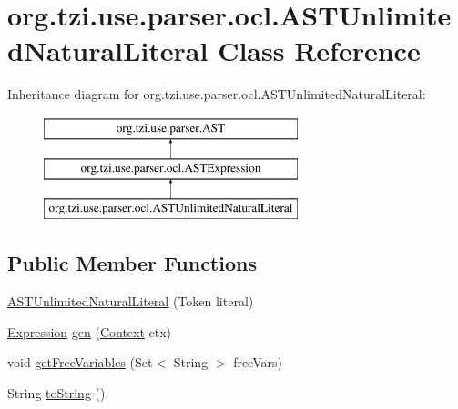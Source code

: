 \hypertarget{classorg_1_1tzi_1_1use_1_1parser_1_1ocl_1_1_a_s_t_unlimited_natural_literal}{\section{org.\-tzi.\-use.\-parser.\-ocl.\-A\-S\-T\-Unlimited\-Natural\-Literal Class Reference}
\label{classorg_1_1tzi_1_1use_1_1parser_1_1ocl_1_1_a_s_t_unlimited_natural_literal}
}
Inheritance diagram for org.\-tzi.\-use.\-parser.\-ocl.\-A\-S\-T\-Unlimited\-Natural\-Literal\-:\begin{figure}[H]
\begin{center}
\leavevmode
\includegraphics[height=3.000000cm]{classorg_1_1tzi_1_1use_1_1parser_1_1ocl_1_1_a_s_t_unlimited_natural_literal}
\end{center}
\end{figure}
\subsection*{Public Member Functions}
\begin{DoxyCompactItemize}
\item 
\hyperlink{classorg_1_1tzi_1_1use_1_1parser_1_1ocl_1_1_a_s_t_unlimited_natural_literal_aca06f215ddb07c109df38e3024618899}{A\-S\-T\-Unlimited\-Natural\-Literal} (Token literal)
\item 
\hyperlink{classorg_1_1tzi_1_1use_1_1uml_1_1ocl_1_1expr_1_1_expression}{Expression} \hyperlink{classorg_1_1tzi_1_1use_1_1parser_1_1ocl_1_1_a_s_t_unlimited_natural_literal_aa05ab36e2d35d191ac691500350d4046}{gen} (\hyperlink{classorg_1_1tzi_1_1use_1_1parser_1_1_context}{Context} ctx)
\item 
void \hyperlink{classorg_1_1tzi_1_1use_1_1parser_1_1ocl_1_1_a_s_t_unlimited_natural_literal_a6c158fd8e982badbbfd6bfdef1dfab1a}{get\-Free\-Variables} (Set$<$ String $>$ free\-Vars)
\item 
String \hyperlink{classorg_1_1tzi_1_1use_1_1parser_1_1ocl_1_1_a_s_t_unlimited_natural_literal_af383904b09789962c14a5bb5e69af39e}{to\-String} ()
\end{DoxyCompactItemize}

